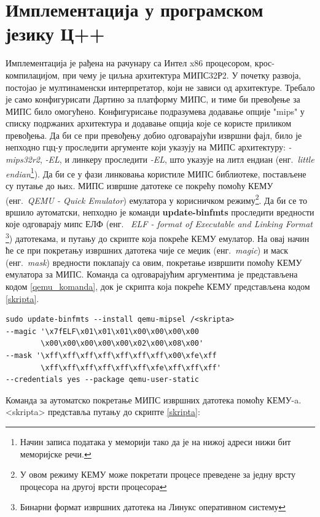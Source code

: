 \documentclass[12pt,oneside]{memoir}
\begin{document}
\section{Имплементација у програмском језику Ц++}
Имплементација је рађена на рачунару са Интел x86 процесором, крос-компилацијом, при чему је циљна архитектура  МИПС32Р2. У почетку развоја, постојао је мултинаменски интерпретатор, који не зависи од архитектуре. Требало је само конфигурисати Дартино за платформу МИПС, и тиме би превођење за МИПС било омогућено. Конфигурисање подразумева додавање опције "mips" у списку подржаних архитектура и додавање опција које се користе приликом превођења. Да би се при превођењу добио одговарајући извршни фајл, било је непходно гцц-у проследити аргументе који указују на МИПС архитектуру: \textit{-mips32r2}, \textit{-EL}, и линкеру проследити \textit{-EL}, што указује на литл ендиан (енг.~\textit{little endian}\footnote{Начин записа података у меморији тако да је на нижој адреси нижи бит меморијске речи.}). Да би се у фази линковања користиле МИПС библиотеке, постављене су путање до њиx. 
МИПС извршне датотеке се покрећу помоћу КЕМУ (енг.~\textit{QEMU - Quick Emulator}) емулатора у корисничком режиму\footnote{У овом режиму КЕМУ може покретати процесе преведене за једну врсту процесора на другој врсти процесора}. Да би се то вршило аутоматски, непходно је команди \textbf{update-binfmts} проследити вредности које одговарају мипс ЕЛФ (енг.~\textit{ ELF - format of Executable and Linking Format} \footnote{Бинарни формат извршних датотека на Линукс оперативном систему}) датотекама, и путању до скрипте која покреће КЕМУ емулатор. На овај начин ће се при покретању извршних датотека чије се меџик (енг.~\textit{magic}) и маск (енг.~\textit{mask}) вредности поклапају са овим, покретање извршити помоћу КЕМУ емулатора за МИПС. Команда са одговарајућим аргументима је представљена кодом \ref{qemu_komanda}, док је скрипта која покреће КЕМУ представљена кодом \ref{skripta}. \\

\begin{listing}
\centering
\begin{verbatim}
sudo update-binfmts --install qemu-mipsel /<skripta>
--magic '\x7fELF\x01\x01\x01\x00\x00\x00\x00
        \x00\x00\x00\x00\x00\x02\x00\x08\x00'
--mask '\xff\xff\xff\xff\xff\xff\xff\x00\xfe\xff
        \xff\xff\xff\xff\xff\xff\xfe\xff\xff\xff'
--credentials yes --package qemu-user-static
\end{verbatim}
\caption{Команда за аутоматско покретање МИПС извршних датотека помоћу КЕМУ-a. <skripta> представља путању до скрипте \ref{skripta}:}
\label{qemu_komanda}
\end{listing}
\end{document}
